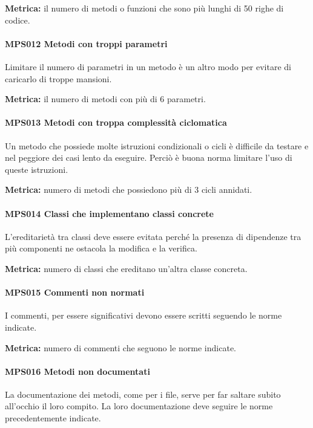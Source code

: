         \textbf{Metrica:} il numero di metodi o funzioni che sono più lunghi di 50 righe di codice.

        \paragraph{MPS012 Metodi con troppi parametri}
        Limitare il numero di parametri in un metodo è un altro modo per evitare di caricarlo di troppe mansioni.

        \textbf{Metrica:} il numero di metodi con più di 6 parametri.

        \paragraph{MPS013 Metodi con troppa complessità ciclomatica}
        Un metodo che possiede molte istruzioni condizionali o cicli è difficile da testare e nel peggiore dei casi lento da eseguire. Perciò è buona norma limitare l'uso di queste istruzioni.

        \textbf{Metrica:} numero di metodi che possiedono più di 3 cicli annidati.

        \paragraph{MPS014 Classi che implementano classi concrete}
        L'ereditarietà tra classi deve essere evitata perché la presenza di dipendenze tra più componenti ne ostacola la modifica e la verifica.

        \textbf{Metrica:} numero di classi che ereditano un'altra classe concreta.

        \paragraph{MPS015 Commenti non normati}
        I commenti, per essere significativi devono essere scritti seguendo le norme indicate.

        \textbf{Metrica:} numero di commenti che seguono le norme indicate.

        \paragraph{MPS016 Metodi non documentati}
        La documentazione dei metodi, come per i file, serve per far saltare subito all'occhio il loro compito. La loro documentazione deve seguire le norme precedentemente indicate.

